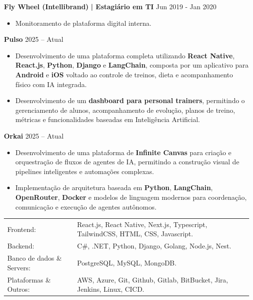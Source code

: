     \textbf{Fly Wheel (Intellibrand)}\textbf{ | Estagiário em TI } \hfill  Jun 2019 - Jan 2020\\
    \vspace{-3mm}
    \begin{itemize} \itemsep -3pt
        \item Monitoramento de plataforma digital interna.
    \end{itemize}

    \vspace{2mm}
    
    \textbf{Pulso} \hfill  2025 -- Atual\\
    \vspace{-3mm}
    \begin{itemize} \itemsep -3pt
        \item Desenvolvimento de uma plataforma completa utilizando \textbf{React Native}, \textbf{React.js}, \textbf{Python}, \textbf{Django} e \textbf{LangChain}, composta por um aplicativo para \textbf{Android} e \textbf{iOS} voltado ao controle de treinos, dieta e acompanhamento físico com IA integrada.
        \item Desenvolvimento de um \textbf{dashboard para personal trainers}, permitindo o gerenciamento de alunos, acompanhamento de evolução, planos de treino, métricas e funcionalidades baseadas em Inteligência Artificial.
    \end{itemize}
    
    \textbf{Orkai} \hfill  2025 -- Atual\\
    \vspace{-3mm}
    \begin{itemize} \itemsep -3pt
        \item Desenvolvimento de uma plataforma de \textbf{Infinite Canvas} para criação e orquestração de fluxos de agentes de IA, permitindo a construção visual de pipelines inteligentes e automações complexas.
        \item Implementação de arquitetura baseada em \textbf{Python}, \textbf{LangChain}, \textbf{OpenRouter}, \textbf{Docker} e modelos de linguagem modernos para coordenação, comunicação e execução de agentes autônomos.
    \end{itemize}
    

    \vspace{2mm}
    \begin{longtable}{p{4cm}p{12cm}}
        Frontend: & React.js, React Native, Next.js, Typescript, TailwindCSS, HTML, CSS, Javascript. \\
        Backend: & C\#, .NET, Python, Django, Golang, Node.js, Nest. \\
        Banco de dados \& Servers: & PostgreSQL, MySQL, MongoDB. \\
        Plataformas \& Outros: &  AWS, Azure, Git, Github, Gitlab, BitBucket, Jira, Jenkins, Linux, CICD. \\
    \end{longtable}
    \vspace{1mm}


